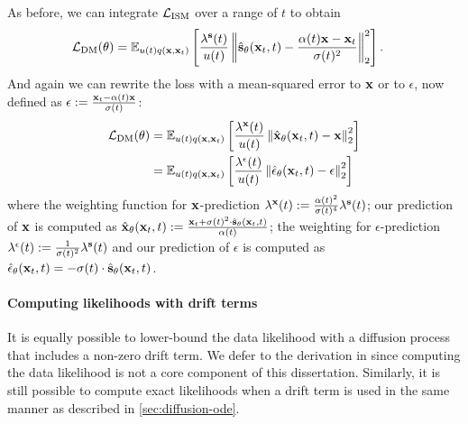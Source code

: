 As before, we can integrate ${\mathcal{L}}_\text{ISM}$ over a range of $t$ to obtain
\begin{align} \label{eq:general-dm-loss-s}
    \mathcal{L}_\text{DM}(\theta) &= \mathbb{E}_{u(t)q({\mathbf{x}}, {\mathbf{x}}_t)} \left[ \frac{\lambda^{\mathbf{s}}(t)}{u(t)} \left\| \hat{{\mathbf{s}}}_\theta({\mathbf{x}}_t, t) - \frac{\alpha(t) {\mathbf{x}}-{\mathbf{x}}_t}{\sigma(t)^2} \right\|_2^2 \right].
\end{align}
And again we can rewrite the loss with a mean-squared error to ${\mathbf{x}}$ or to $\epsilon$, now defined as $\epsilon := \frac{{\mathbf{x}}_t-\alpha(t){\mathbf{x}}}{\sigma(t)}$:
\begin{align} \label{eq:general-dm-loss}
    \mathcal{L}_\text{DM}(\theta) &= \mathbb{E}_{u(t)q({\mathbf{x}}, {\mathbf{x}}_t)} \left[ \frac{\lambda^{\mathbf{x}}(t)}{u(t)} \left\| \hat{{\mathbf{x}}}_\theta({\mathbf{x}}_t, t) - {\mathbf{x}} \right\|_2^2 \right] \\
     &= \mathbb{E}_{u(t)q({\mathbf{x}}, {\mathbf{x}}_t)} \left[ \frac{\lambda^\epsilon(t)}{u(t)} \left\| \hat{\mathbf{\epsilon}}_\theta({\mathbf{x}}_t, t) - \epsilon \right\|_2^2 \right] \label{eq:diffusion-general-epsilon-prediction}
\end{align}
where the weighting function for ${\mathbf{x}}$-prediction $\lambda^{\mathbf{x}}(t) := \frac{\alpha(t)^2}{\sigma(t)^4}\lambda^{\mathbf{s}}(t)$; our prediction of ${\mathbf{x}}$ is computed as $\hat{{\mathbf{x}}}_\theta({\mathbf{x}}_t, t) := \frac{{\mathbf{x}}_t + \sigma(t)^2 \cdot \hat{{\mathbf{s}}}_\theta({\mathbf{x}}_t, t)}{\alpha(t)}$; the weighting for $\epsilon$-prediction $\lambda^\epsilon(t) := \frac{1}{\sigma(t)^2} \lambda^{\mathbf{s}}(t)$ and our prediction of $\epsilon$ is computed as $\hat{\mathbf{\epsilon}}_\theta({\mathbf{x}}_t, t) = - \sigma(t) \cdot \hat{{\mathbf{s}}}_\theta({\mathbf{x}}_t, t)$.

\paragraph{Computing likelihoods with drift terms}
It is equally possible to lower-bound the data likelihood with a diffusion process that includes a non-zero drift term. We defer to the derivation in \citet{kingma2021variational} since computing the data likelihood is not a core component of this dissertation. Similarly, it is still possible to compute exact likelihoods when a drift term is used in the same manner as described in \cref{sec:diffusion-ode}.